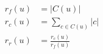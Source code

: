 \begin{align}
	r_{f}(u) &= |C(u)| \label{eq:rankFunF}  \\ 
	r_{c}(u) &= \sum_{c \in C(u)}|c| \label{eq:rankFunC} \\ 
	r_{r}(u) &= \frac{r_{c}(u)}{r_{f}(u)} \label{eq:rankFunR}
\end{align}
